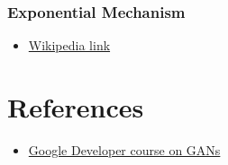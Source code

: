 \documentclass{article}
\begin{document}
\subsubsection{Exponential Mechanism}

\begin{itemize}
    \item \href{https://en.wikipedia.org/wiki/Exponential_mechanism_(differential_privacy)}{Wikipedia link}
\end{itemize}


\section{References}
\begin{itemize}
    \item \href{https://developers.google.com/machine-learning/gan}{Google Developer course on GANs}
\end{itemize}
\end{document}
